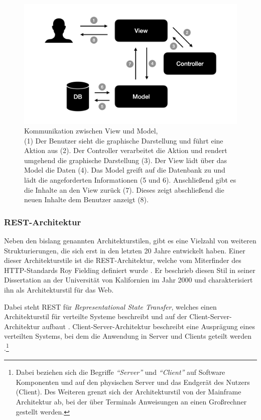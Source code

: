  \begin{figure}
 	\centering
    \includegraphics[width=.6\textwidth]{Assets/Interaktionsorientiert.002}
	\caption[Kommunikation zwischen View und Model]{Kommunikation zwischen View und Model, \\ (1) Der Benutzer sieht die graphische Darstellung und führt eine Aktion aus (2). Der Controller verarbeitet die Aktion und rendert umgehend die graphische Darstellung (3). Der View lädt über das Model die Daten (4). Das Model greift auf die Datenbank zu und lädt die angeforderten Informationen (5 und 6). Anschließend gibt es die Inhalte an den View zurück (7). Dieses zeigt abschließend die neuen Inhalte dem Benutzer anzeigt (8).}
    \label{fig:mvc-vm-kommunikation}
 \end{figure}

\subsubsection{REST-Architektur}
\label{sec:rest}

Neben den bislang genannten Architekturstilen, gibt es eine Vielzahl von weiteren Strukturierungen, die sich erst in den letzten 20 Jahre entwickelt haben. Einer dieser Architekturstile ist die REST-Architektur, welche vom Miterfinder des HTTP-Standards Roy Fielding definiert wurde \parencite[][S. 128]{starke_effektive_2015}. Er beschrieb diesen Stil in seiner Dissertation an der Universität von Kalifornien im Jahr 2000 und charakterisiert ihn als Architekturstil für das Web.

Dabei steht REST für \textit{Representational State Transfer}, welches einen Architekturstil für verteilte Systeme beschreibt und auf der Client-Server-Architektur aufbaut \parencite[][S. 76]{fielding_architectural_2000}. Client-Server-Architektur beschreibt eine Ausprägung eines verteilten Systems, bei dem die Anwendung in Server und Clients geteilt werden \parencite[][S. 117]{starke_effektive_2015}.\footnote{Dabei beziehen sich die Begriffe \textit{\enquote{Server}} und \textit{\enquote{Client}} auf Software Komponenten und auf den physischen Server und das Endgerät des Nutzers (Client). Des Weiteren grenzt sich der Architekturstil von der Mainframe Architektur ab, bei der über Terminals Anweisungen an einen Großrechner gestellt werden.}

